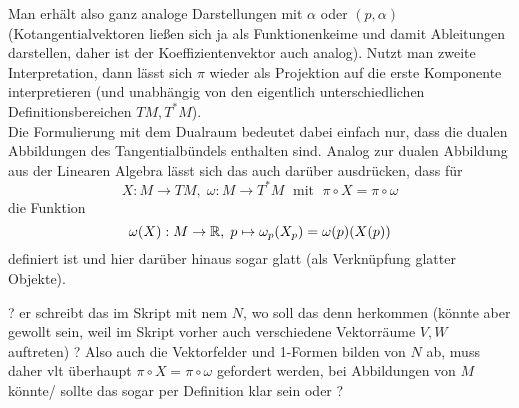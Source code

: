 \documentclass[../H_Analysis_main.tex]{subfiles}
\begin{document}
Man erhält also ganz analoge Darstellungen mit $\alpha$ oder $(p, \alpha)$ (Kotangentialvektoren ließen sich ja als Funktionenkeime und damit Ableitungen darstellen, daher ist der Koeffizientenvektor auch analog). Nutzt man zweite Interpretation, dann lässt sich $\pi$ wieder als Projektion auf die erste Komponente interpretieren (und unabhängig von den eigentlich unterschiedlichen Definitionsbereichen $TM, T^* M$).\\


Die Formulierung mit dem Dualraum bedeutet dabei einfach nur, dass die dualen Abbildungen des Tangentialbündels enthalten sind. Analog zur dualen Abbildung aus der Linearen Algebra lässt sich das auch darüber ausdrücken, dass für
\begin{equation*}
X: M \rightarrow TM, \; \omega: M \rightarrow T^*M \; \text{ mit } \; \pi \circ X = \pi \circ \omega
\end{equation*}
die Funktion
\begin{equation}
\omega(X): M \rightarrow \mathbb{R}, \; p \mapsto \omega_p(X_p) = \omega(p)\qty(X(p))
\end{equation}
definiert ist und hier darüber hinaus sogar glatt (als Verknüpfung glatter Objekte).%

? er schreibt das im Skript mit nem $N$, wo soll das denn herkommen (könnte aber gewollt sein, weil im Skript vorher auch verschiedene Vektorräume $V, W$ auftreten) ? Also auch die Vektorfelder und 1-Formen bilden von $N$ ab, muss daher vlt überhaupt $\pi \circ X = \pi \circ \omega$ gefordert werden, bei Abbildungen von $M$ könnte/ sollte das sogar per Definition klar sein oder ?
\end{document}
